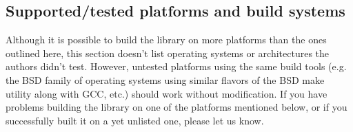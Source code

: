 \subsection{Supported/tested platforms and build systems}

Although it is possible to build the  library on more platforms
than the ones outlined here, this section doesn't list operating systems or
architectures the authors didn't test. However, untested platforms using
the same build tools (e.g. the BSD family of operating systems using similar
flavors of the BSD make utility along with GCC, etc.) should work without
modification. If you have problems building the  library on one of the
platforms mentioned below, or if you successfully built it on a yet unlisted
one, please let us know.\\
\\

